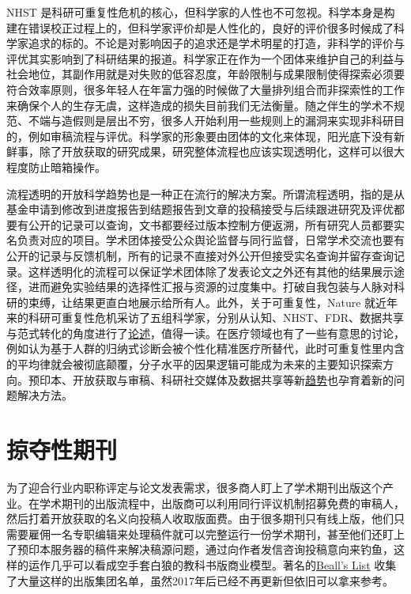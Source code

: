 \documentclass[]{tufte-book}
\begin{document}
NHST 是科研可重复性危机的核心，但科学家的人性也不可忽视。科学本身是构建在错误校正过程上的，但科学家评价却是人性化的，良好的评价很多时候成了科学家追求的标的。不论是对影响因子的追求还是学术明星的打造，非科学的评价与评优其实影响到了科研结果的报道。科学家正在作为一个团体来维护自己的利益与社会地位，其副作用就是对失败的低容忍度，年龄限制与成果限制使得探索必须要符合效率原则，很多年轻人在年富力强的时候做了大量排列组合而非探索性的工作来确保个人的生存无虞，这样造成的损失目前我们无法衡量。随之伴生的学术不规范、不端与造假则是层出不穷，很多人开始利用一些规则上的漏洞来实现非科研目的，例如审稿流程与评优。科学家的形象要由团体的文化来体现，阳光底下没有新鲜事，除了开放获取的研究成果，研究整体流程也应该实现透明化，这样可以很大程度防止暗箱操作。

流程透明的开放科学趋势也是一种正在流行的解决方案。所谓流程透明，指的是从基金申请到修改到进度报告到结题报告到文章的投稿接受与后续跟进研究及评优都要有公开的记录可以查询，文书都要经过版本控制方便返溯，所有研究人员都要实名负责对应的项目。学术团体接受公众舆论监督与同行监督，日常学术交流也要有公开的记录与反馈机制，所有的记录不直接对外公开但接受实名查询并留存查询记录。这样透明化的流程可以保证学术团体除了发表论文之外还有其他的结果展示途径，进而避免实验结果的选择性汇报与资源的过度集中。打破自我包装与人脉对科研的束缚，让结果更直白地展示给所有人。此外，关于可重复性，Nature 就近年来的科研可重复性危机采访了五组科学家，分别从认知、NHST、FDR、数据共享与范式转化的角度进行了\href{https://www.nature.com/articles/d41586-017-07522-z}{论述}，值得一读。在医疗领域也有了一些有意思的讨论，例如认为基于人群的归纳式诊断会被个性化精准医疗所替代，此时可重复性里内含的平均律就会被彻底颠覆，分子水平的因果逻辑可能成为未来的主要知识探索方向。预印本、开放获取与审稿、科研社交媒体及数据共享等新\href{https://theoreticalecology.wordpress.com/2019/01/22/tree-species-richness-and-its-effects-on-productivity-neither-global-nor-consistent/}{趋势}也孕育着新的问题解决方法。

\hypertarget{ux63a0ux593aux6027ux671fux520a}{%
\section{掠夺性期刊}\label{ux63a0ux593aux6027ux671fux520a}}

为了迎合行业内职称评定与论文发表需求，很多商人盯上了学术期刊出版这个产业。在学术期刊的出版流程中，出版商可以利用同行评议机制招募免费的审稿人，然后打着开放获取的名义向投稿人收取版面费。由于很多期刊只有线上版，他们只需要雇佣一名专职编辑来处理稿件就可以完整运行一份学术期刊，甚至他们还盯上了预印本服务器的稿件来解决稿源问题，通过向作者发信咨询投稿意向来钓鱼，这样的运作几乎可以看成空手套白狼的教科书版商业模型。著名的\href{https://beallslist.net/}{Beall's List} 收集了大量这样的出版集团名单，虽然2017年后已经不再更新但依旧可以拿来参考。
\end{document}
